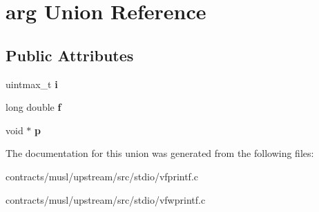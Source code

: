 \hypertarget{unionarg}{}\section{arg Union Reference}
\label{unionarg}
\subsection*{Public Attributes}
\begin{DoxyCompactItemize}
\item 
\mbox{\label{unionarg_a2c5f0038c3e4feeb5d367ef1c4684101}} 
uintmax\+\_\+t {\bfseries i}
\item 
\mbox{\label{unionarg_a776a7fe1653dda8b667fa80421d15c71}} 
long double {\bfseries f}
\item 
\mbox{\label{unionarg_a3e1f1ababbad4487cc7a492e34b7f74b}} 
void $\ast$ {\bfseries p}
\end{DoxyCompactItemize}


The documentation for this union was generated from the following files\+:\begin{DoxyCompactItemize}
\item 
contracts/musl/upstream/src/stdio/vfprintf.\+c\item 
contracts/musl/upstream/src/stdio/vfwprintf.\+c\end{DoxyCompactItemize}

